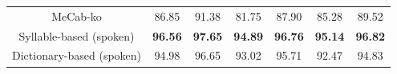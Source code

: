 \documentclass[AMS,STIX2COL]{WileyNJD-v2}
\begin{document}
\begin{table}[ht]
\begin{tabular*}{500pt}{@{\extracolsep\fill}c|cccccc@{\extracolsep\fill}}
            \midrule
            \hspace{2mm}MeCab-ko                   & 86.85                      & 91.38                        & 81.75                      & 87.90                        & 85.28                      & 89.52                        \\
            \hspace{2mm}Syllable-based (spoken)    & \textbf{96.56}             & \textbf{97.65}               & \textbf{94.89}             & \textbf{96.76}               & \textbf{95.14}             & \textbf{96.82}               \\
            \hspace{2mm}Dictionary-based (spoken)  & 94.98                      & 96.65                        & 93.02                      & 95.71                        & 92.47                      & 94.83                        \\
            \bottomrule
        \end{tabular*}
    \end{table}
\end{document}
